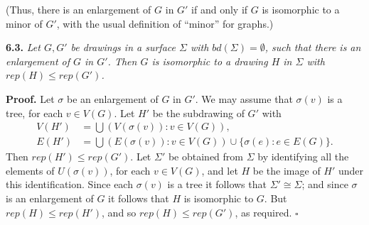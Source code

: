 (Thus, there is an enlargement of $G$ in $G'$ if and only if $G$ is isomorphic to a minor of $G'$, with the usual definition of ``minor'' for graphs.)

\textbf{6.3.} \textit{Let $G, G'$ be drawings in a surface $\Sigma$ with $bd(\Sigma) = \emptyset$, such that there is an enlargement of $G$ in $G'$. Then $G$ is isomorphic to a drawing $H$ in $\Sigma$ with $rep(H) \le rep(G')$.}

\textbf{Proof.} Let $\sigma$ be an enlargement of $G$ in $G'$. We may assume that $\sigma(v)$ is a tree, for each $v \in V(G)$. Let $H'$ be the subdrawing of $G'$ with
\begin{align*}
V(H') &= \bigcup (V(\sigma(v)) : v \in V(G)), \\
E(H') &= \bigcup (E(\sigma(v)) : v \in V(G)) \cup \{\sigma(e) : e \in E(G)\}.
\end{align*}
Then $rep(H') \le rep(G')$. Let $\Sigma'$ be obtained from $\Sigma$ by identifying all the elements of $U(\sigma(v))$, for each $v \in V(G)$, and let $H$ be the image of $H'$ under this identification. Since each $\sigma(v)$ is a tree it follows that $\Sigma' \cong \Sigma$; and since $\sigma$ is an enlargement of $G$ it follows that $H$ is isomorphic to $G$. But $rep(H) \le rep(H')$, and so $rep(H) \le rep(G')$, as required. $\square$
